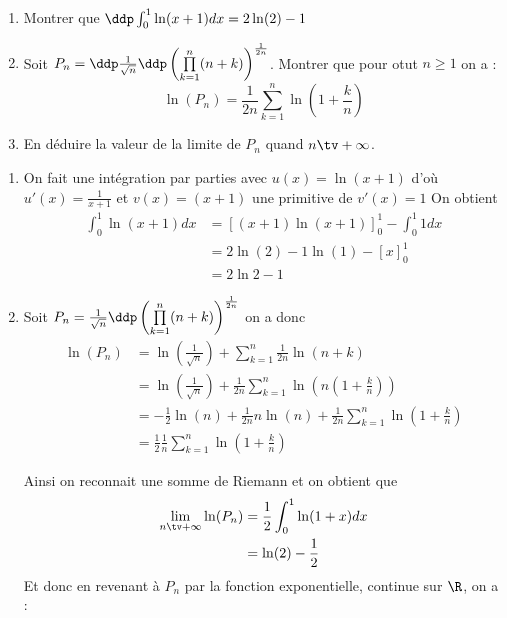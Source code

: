 \documentclass[a4paper, 11pt,reqno]{article}
\begin{document}
\vspace{1.8cm}


\begin{exercice}
\begin{enumerate}
\item Montrer que $\ddp \int_0^1 \ln(x+1) dx = 2\ln(2)-1$
\item Soit $P_n =  \ddp \frac1{\sqrt{n}}\ddp\left( \prod\limits_{k=1}^n (n+k)  \right)^{\frac{1}{2n}}$. Montrer que pour otut $n\geq 1$ on a :
$$\ln(P_n) = \frac{1}{2n}\sum_{k=1}^n\ln\left(1+\frac{k}{n}\right)$$
\item En déduire la valeur de la limite de $P_n$ quand $n\tv +\infty$.
\end{enumerate}
\end{exercice}

\begin{correction}
\begin{enumerate}
\item On fait une intégration par parties avec $u(x)=\ln(x+1) $ d'où $u'(x)=\frac{1}{x+1}$ et $v(x) =(x+1)$ une primitive de $v'(x) =1$
On obtient 
\begin{align*}
 \int_0^1 \ln(x+1) dx&=[(x+1)\ln(x+1)]_0^1 -\int_0^1 1dx\\
 									&= 2\ln(2) -1\ln(1) -[x]_0^1\\
 									&= 2\ln2 -1
\end{align*}

\item 
Soit $P_n=\frac1{\sqrt{n}}\ddp\left( \prod\limits_{k=1}^n (n+k)  \right)^{\frac{1}{2n}}$ on a donc
\begin{align*}
\ln(P_n) & =\ln(\frac1{\sqrt{n}})  +\sum_{k=1}^n \frac{1}{2n}\ln(n+k)\\
				&= \ln(\frac1{\sqrt{n}})  + \frac{1}{2n} \sum_{k=1}^n \ln\left(n(1+\frac{k}{n})\right)\\
				&=-\frac{1}{2}\ln(n)  +\frac{1}{2n} n\ln(n)  +\frac{1}{2n}  \sum_{k=1}^n  \ln \left(1+\frac{k}{n}\right)\\
				&=\frac{1}{2}\frac{1}{n} \sum_{k=1}^n  \ln\left(1+\frac{k}{n}\right)
\end{align*}

Ainsi on reconnait une somme de Riemann et on obtient que 
\begin{align*}
\lim_{n\tv +\infty} \ln(P_n)  &=  \frac{1}{2 }\int_0^1 \ln(1+x)dx\\
											&= \ln(2)-\frac{1}{2}
\end{align*}
Et donc en revenant à  $P_n$ par la fonction exponentielle, continue sur $\R$, on a : 


\end{enumerate}
\end{correction}
\end{document}
